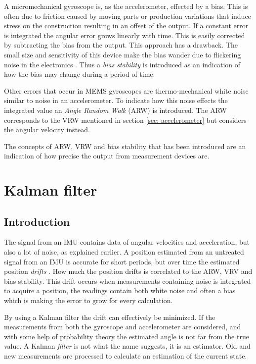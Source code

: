 \documentclass[a4paper,11pt]{kth-mag}
\begin{document}
A micromechanical gyroscope is, as the accelerometer, effected by a bias. This is often due to friction caused by moving parts or production variations that induce stress on the construction resulting in an offset of the output. If a constant error is integrated the angular error grows linearly with time. This is easily corrected by subtracting the bias from the output.
This approach has a drawback. The small size and sensitivity of this device make the bias wander due to flickering noise in the electronics \cite{IMUintro}. Thus a \textit{bias stability} is introduced as an indication of how the bias may change during a period of time.

Other errors that occur in MEMS gyroscopes are thermo-mechanical white noise similar to noise in an accelerometer. To indicate how this noise effects the integrated value an \textit{Angle Random Walk} (ARW) is introduced. The ARW corresponds to the VRW mentioned in section \ref{sec: accelerometer} but considers the angular velocity instead.

The concepts of ARW, VRW and bias stability that has been introduced are an indication of how precise the output from measurement devices are.

\section{Kalman filter} \label{section: Kalman}
\subsection{Introduction}
The signal from an IMU contains data of angular velocities and acceleration, but also a lot of noise, as explained earlier. A position estimated from an untreated signal from an IMU is accurate for short periods, but over time the estimated position \textit{drifts} \cite{MEMSdrift}. How much the position drifts is correlated to the ARW, VRV and bias stability. This drift occurs when measurements containing noise is integrated to acquire a position, the readings contain both white noise and often a bias which is making the  error to grow for every calculation.

By using a Kalman filter the drift can effectively be minimized. If the measurements from both the gyroscope and accelerometer are considered, and with some help of probability theory the estimated angle is not far from the true value.  A Kalman \textit{filter} is not what the name suggests, it is an estimator. Old and new measurements are processed to calculate an estimation of the current state. 
\end{document}
